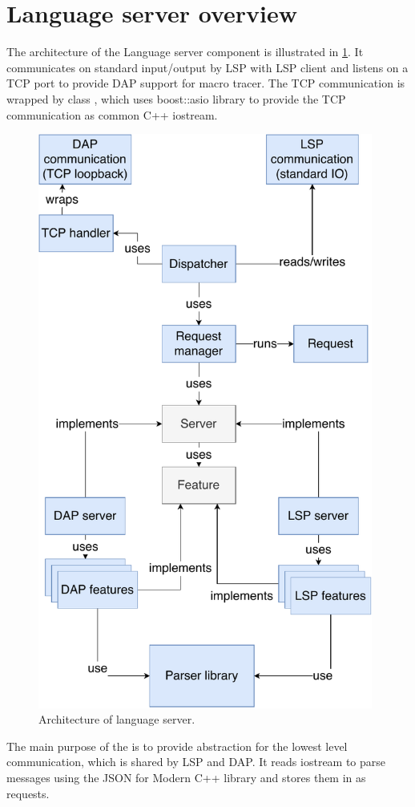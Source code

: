 \section{Language server overview}
The architecture of the Language server component is illustrated in \cref{lang_server_arch}. It communicates on standard input/output by LSP with LSP client and listens on a TCP port to provide DAP support for macro tracer. The TCP communication is wrapped by class , which uses boost::asio library to provide the TCP communication as common C++ iostream.


\begin{figure}
	\centering
	\includegraphics[width=11cm]{img/lang_server}
	\caption{Architecture of language server.}
	\label{lang_server_arch}
\end{figure}


The main purpose of the  is to provide abstraction for the lowest level communication, which is shared by LSP and DAP. It reads iostream to parse messages using the JSON for Modern C++ library and stores them in  as requests.

